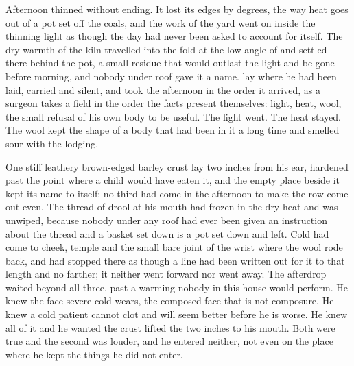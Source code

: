 \scenebreak

Afternoon thinned without ending. It lost its edges by degrees, the way heat goes out of a pot set off the coals, and the work of the yard went on inside the thinning light as though the day had never been asked to account for itself. The dry warmth of the kiln travelled into the fold at the low angle of  and settled there behind the pot, a small residue that would outlast the light and be gone before morning, and nobody under  roof gave it a name.  lay where he had been laid, carried and silent, and took the afternoon in the order it arrived, as a surgeon takes a field in the order the facts present themselves: light, heat, wool, the small refusal of his own body to be useful. The light went. The heat stayed. The wool kept the shape of a body that had been in it a long time and smelled sour with the lodging.

One stiff leathery brown-edged barley crust lay two inches from his ear, hardened past the point where a child would have eaten it, and the empty place beside it kept its name to itself; no third had come in the afternoon to make the row come out even. The thread of drool at his mouth had frozen in the dry heat and was unwiped, because nobody under any roof had ever been given an instruction about the thread and a basket set down is a pot set down and left. Cold had come to cheek, temple and the small bare joint of the wrist where the wool rode back, and had stopped there as though a line had been written out for it to that length and no farther; it neither went forward nor went away. The afterdrop waited beyond all three, past a warming nobody in this house would perform. He knew the face severe cold wears, the composed face that is not composure. He knew a cold patient cannot clot and will seem better before he is worse. He knew all of it and he wanted the crust lifted the two inches to his mouth. Both were true and the second was louder, and he entered neither, not even on the place where he kept the things he did not enter.

